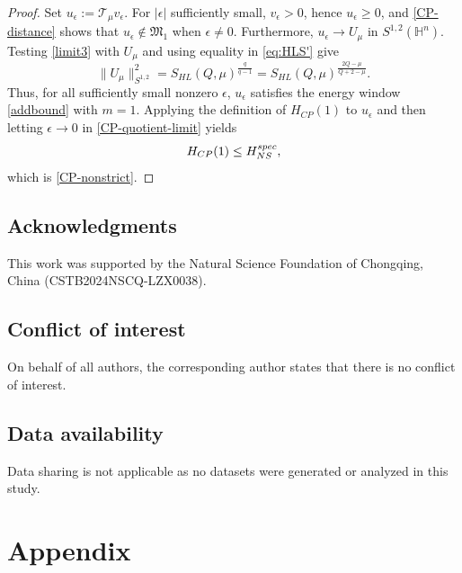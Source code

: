 \documentclass[10pt,a4paper]{amsart}
\begin{document}
\begin{proof}
Set $u_\epsilon:=\mathcal T_\mu v_\epsilon$. For $|\epsilon|$ sufficiently small, $v_\epsilon>0$, hence $u_\epsilon\ge0$, and \eqref{CP-distance} shows that $u_\epsilon\notin\mathfrak M_1$ when $\epsilon\ne0$. Furthermore, $u_\epsilon\to U_\mu$ in $S^{1,2}(\mathbb H^n)$. Testing \eqref{limit3} with $U_\mu$ and using equality in \eqref{eq:HLS'} give
\[
 \|U_\mu\|_{S^{1,2}}^2
 =S_{HL}(Q,\mu)^{\frac{q}{q-1}}
 =S_{HL}(Q,\mu)^{\frac{2Q-\mu}{Q+2-\mu}}.
\]
Thus, for all sufficiently small nonzero $\epsilon$, $u_\epsilon$ satisfies the energy window \eqref{addbound} with $m=1$. Applying the definition of $H_{CP}(1)$ to $u_\epsilon$ and then letting $\epsilon\to0$ in \eqref{CP-quotient-limit} yields
\[
 H_{CP}(1)\le H_{NS}^{\rm spec},
\]
which is \eqref{CP-nonstrict}.
\end{proof}
\endgroup

\subsection*{Acknowledgments}
{This work was supported by the Natural Science Foundation of Chongqing, China} (CSTB2024NSCQ-LZX0038).


\subsection*{Conflict of interest}
On behalf of all authors, the corresponding author states that there is no conflict of interest.

\vspace{.2cm}

\subsection*{Data availability}
{Data sharing is not applicable as no datasets were generated or analyzed in this study.}



\section{Appendix}\label{App}


\begingroup
\end{document}
